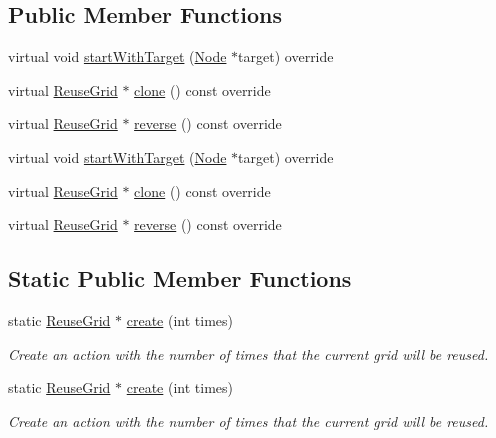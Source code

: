 \subsection*{Public Member Functions}
\begin{DoxyCompactItemize}
\item 
virtual void \hyperlink{classReuseGrid_abf42c6057c8691102243dddcce1d749f}{start\+With\+Target} (\hyperlink{classNode}{Node} $\ast$target) override
\item 
virtual \hyperlink{classReuseGrid}{Reuse\+Grid} $\ast$ \hyperlink{classReuseGrid_ac673b0ea0d616453756f40c4d04943ca}{clone} () const override
\item 
virtual \hyperlink{classReuseGrid}{Reuse\+Grid} $\ast$ \hyperlink{classReuseGrid_ac5ec66174df4786da1005acbcb9b62a8}{reverse} () const override
\item 
virtual void \hyperlink{classReuseGrid_a7d81825e327a71fa4473f47aa4186f3b}{start\+With\+Target} (\hyperlink{classNode}{Node} $\ast$target) override
\item 
virtual \hyperlink{classReuseGrid}{Reuse\+Grid} $\ast$ \hyperlink{classReuseGrid_a8a2953d1479f6753fa7b6c82864c5781}{clone} () const override
\item 
virtual \hyperlink{classReuseGrid}{Reuse\+Grid} $\ast$ \hyperlink{classReuseGrid_aeabc5f387fb58963ae2682799742a536}{reverse} () const override
\end{DoxyCompactItemize}
\subsection*{Static Public Member Functions}
\begin{DoxyCompactItemize}
\item 
static \hyperlink{classReuseGrid}{Reuse\+Grid} $\ast$ \hyperlink{classReuseGrid_acb57eaff876f9b0c5c7f97842bcc8e6f}{create} (int times)
\begin{DoxyCompactList}\small\item\em Create an action with the number of times that the current grid will be reused. \end{DoxyCompactList}\item 
static \hyperlink{classReuseGrid}{Reuse\+Grid} $\ast$ \hyperlink{classReuseGrid_ab3a9fcff1ad7007043356387489bc5c3}{create} (int times)
\begin{DoxyCompactList}\small\item\em Create an action with the number of times that the current grid will be reused. \end{DoxyCompactList}\end{DoxyCompactItemize}
